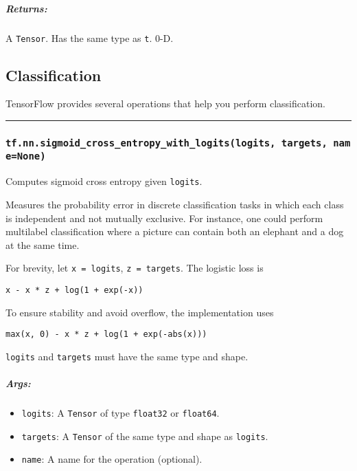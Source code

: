 \subparagraph{Returns: }\label{returns-16}

A \texttt{Tensor}. Has the same type as \texttt{t}. 0-D.

\subsection{Classification }\label{classification}

TensorFlow provides several operations that help you perform
classification.

\begin{center}\rule{0.5\linewidth}{\linethickness}\end{center}

\subsubsection{\texorpdfstring{\texttt{tf.nn.sigmoid\_cross\_entropy\_with\_logits(logits,\ targets,\ name=None)}
}{tf.nn.sigmoid\_cross\_entropy\_with\_logits(logits, targets, name=None) }}\label{tf.nn.sigmoidux5fcrossux5fentropyux5fwithux5flogitslogits-targets-namenone}

Computes sigmoid cross entropy given \texttt{logits}.

Measures the probability error in discrete classification tasks in which
each class is independent and not mutually exclusive. For instance, one
could perform multilabel classification where a picture can contain both
an elephant and a dog at the same time.

For brevity, let \texttt{x\ =\ logits}, \texttt{z\ =\ targets}. The
logistic loss is

\begin{verbatim}
x - x * z + log(1 + exp(-x))
\end{verbatim}

To ensure stability and avoid overflow, the implementation uses

\begin{verbatim}
max(x, 0) - x * z + log(1 + exp(-abs(x)))
\end{verbatim}

\texttt{logits} and \texttt{targets} must have the same type and shape.

\subparagraph{Args: }\label{args-17}

\begin{itemize}
\tightlist
\item
  \texttt{logits}: A \texttt{Tensor} of type \texttt{float32} or
  \texttt{float64}.
\item
  \texttt{targets}: A \texttt{Tensor} of the same type and shape as
  \texttt{logits}.
\item
  \texttt{name}: A name for the operation (optional).
\end{itemize}

